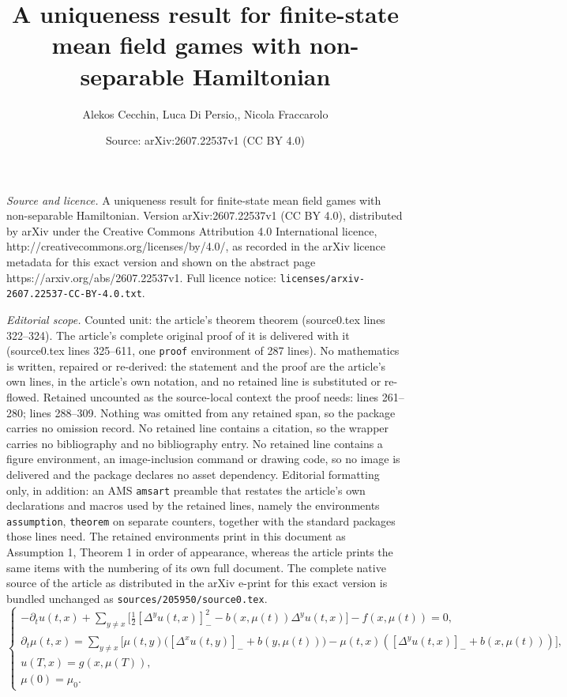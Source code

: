 \documentclass[10pt,a4paper]{amsart}
\title{A uniqueness result for finite-state mean field games with non-separable Hamiltonian}
\author{Alekos Cecchin, Luca Di Persio,, Nicola Fraccarolo}
\date{Source: arXiv:2607.22537v1 (CC BY 4.0)}
\begin{document}
\maketitle

\noindent\emph{Source and licence.} A uniqueness result for finite-state mean field games with non-separable Hamiltonian. Version arXiv:2607.22537v1 (CC BY 4.0), distributed by arXiv under the Creative Commons Attribution 4.0 International licence, http://creativecommons.org/licenses/by/4.0/, as recorded in the arXiv licence metadata for this exact version and shown on the abstract page https://arxiv.org/abs/2607.22537v1. Full licence notice: \texttt{licenses/arxiv-2607.22537-CC-BY-4.0.txt}.\par\smallskip

\noindent\textit{Editorial scope.} Counted unit: the article's theorem theorem (source0.tex lines 322--324). The article's complete original proof of it is delivered with it (source0.tex lines 325--611, one \texttt{proof} environment of 287 lines). No mathematics is written, repaired or re-derived: the statement and the proof are the article's own lines, in the article's own notation, and no retained line is substituted or re-flowed.  Retained uncounted as the source-local context the proof needs: lines 261--280; lines 288--309.  Nothing was omitted from any retained span, so the package carries no omission record.  No retained line contains a citation, so the wrapper carries no bibliography and no bibliography entry.  No retained line contains a figure environment, an image-inclusion command or drawing code, so no image is delivered and the package declares no asset dependency.  Editorial formatting only, in addition: an AMS \texttt{amsart} preamble that restates the article's own declarations and macros used by the retained lines, namely the environments \texttt{assumption}, \texttt{theorem} on separate counters, together with the standard packages those lines need.  The retained environments print in this document as Assumption 1, Theorem 1 in order of appearance, whereas the article prints the same items with the numbering of its own full document.  The complete native source of the article as distributed in the arXiv e-print for this exact version is bundled unchanged as \texttt{sources/205950/source0.tex}.
\begin{equation}\label{eqn:MFG system}
    \begin{cases}
        -\partial_t u(t,x) 
        + \displaystyle\sum_{y \neq x} 
        \bigg[
        \frac{1}{2} [\Delta^y u(t,x)]^2_- 
        - b(x,\mu(t))\Delta^y u(t,x) 
        \bigg]
        - f(x,\mu(t)) 
        = 0, \\
        \partial_t \mu(t,x) 
        = \displaystyle\sum_{y \neq x} 
        \Big[
        \mu(t,y) \big( [\Delta^{x}u(t,y)]_{-} + b(y,\mu(t)) \big)
        - \mu(t,x) \left( [\Delta^{y}u(t,x)]_{-} + b(x,\mu(t)) \right)
        \Big],\\
        u(T,x) = g(x,\mu(T)), \\
        \mu(0) = \mu_{0}.
    \end{cases}
\end{equation}
\end{document}
